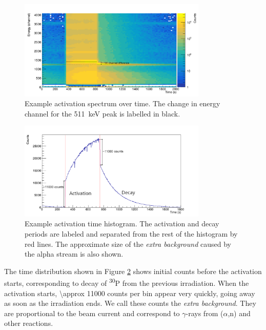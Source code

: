 \documentclass[a4paper,12pt]{report}
\newcommand{\an}{($\alpha$,n) }
\newcommand{\Piso}{\textsuperscript{30}P }
\begin{document}
\begin{figure}[H]
	\centering
	\includegraphics[width=0.80\textwidth]{example_activation_energytime.png}
	\caption{Example activation spectrum over time.	%
	The change in energy channel for the \qty{511}{\keV} peak is labelled in black.}
	\label{example_activation_energytime}
\end{figure}

\begin{figure}[H]
	\centering
	\includegraphics[width=0.80\textwidth]{example_activation_time_histogram.png}
	\caption{Example activation time histogram.
	The activation and decay periods are labeled and separated from the rest of the histogram by red lines.
	The approximate size of the \textit{extra background} caused by the alpha stream is also shown.}
	\label{example_activation_time_histogram}
\end{figure}

The time distribution shown in Figure \ref{example_activation_time_histogram} shows initial counts before the activation starts, corresponding to decay of \Piso from the previous irradiation.
When the activation starts, \num{\approx 11000} counts per bin appear very quickly, going away as soon as the irradiation ends.
We call these counts the \textit{extra background}.
They are proportional to the beam current and correspond to $\gamma$-rays from \an and other reactions.
\end{document}
